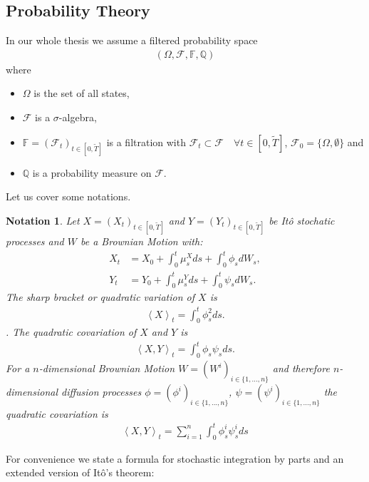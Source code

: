 \documentclass[12pt]{article}
\newtheorem{notation}[theorem]{Notation}
\begin{document}
	\subsection{Probability Theory}
	In our whole thesis we assume a filtered probability space
	\begin{align*}
		(\Omega, \mathcal{F}, \mathbb{F}, \mathbb{Q})
	\end{align*}
	where
	\begin{itemize}
		\item $\Omega$ is the set of all states,
		\item $\mathcal{F}$ is a $\sigma$-algebra,
		\item $\mathbb{F} = (\mathcal{F}_t)_{t \in \left[0,\tilde{T}\right]}$ is a filtration with $\mathcal{F}_t \subset \mathcal{F} \quad \forall t \in [0,\tilde{T}]$, $\mathcal{F}_0 = \{\Omega, \emptyset \}$ and
		\item $\mathbb{Q}$ is a probability measure on $\mathcal{F}$.
	\end{itemize}
	Let us cover some notations.
	\begin{notation}
		Let $X=(X_t)_{t\in \left[0,\tilde{T}\right]}$ and $Y=(Y_t)_{t\in \left[0,\tilde{T}\right]}$ be Itô stochatic processes and $W$ be a Brownian Motion with:
		\begin{align*}
			X_t &= X_0 + \int_{0}^{t}\mu^X_s ds + \int_{0}^{t}\phi_s dW_s, \\
			Y_t &= Y_0 + \int_{0}^{t}\mu^Y_s ds + \int_{0}^{t}\psi_s dW_s.
		\end{align*}
		The \emph{sharp bracket} or \emph{quadratic variation} of $X$ is 
		\begin{align*}
			\left\langle X \right\rangle_t = \int_{0}^{t}\phi_s^2 ds.
		\end{align*}.
		The \emph{quadratic covariation} of $X$ and $Y$ is 
		\begin{align*}
			\left\langle X, Y \right\rangle_t = \int_{0}^{t}\phi_s \psi_s ds.
		\end{align*}
		For a $n$-dimensional Brownian Motion $W = (W^i)_{i\in\{1,...,n\}}$ and therefore $n$-dimensional diffusion processes $\phi=(\phi^i)_{i \in \{1,..., n\}}$, $\psi=(\psi^i)_{i \in \{1,..., n\}}$ the quadratic covariation is
		\begin{align*}
			\left\langle X, Y \right\rangle_t = \sum_{i=1}^{n} \int_{0}^{t} \phi^i_s \psi^i_s ds
		\end{align*}
	\end{notation}
	For convenience we state a formula for stochastic integration by parts and an extended version of Itô's theorem:
\end{document}
